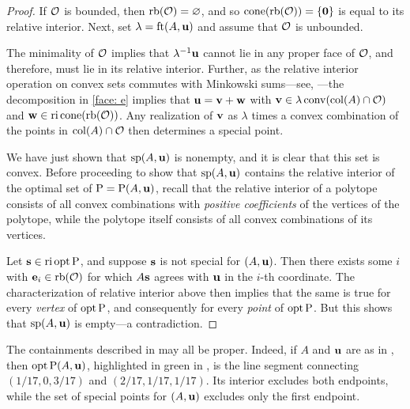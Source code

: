 \documentclass[11pt]{amsart}
\begin{document}
\begin{proof}
   If $\mathcal{O}$ is bounded, then $\operatorname{rb}(\mathcal{O}) = \varnothing$, and so $\operatorname{cone}( \operatorname{rb}(\mathcal{O})) = \{\mathbf{0} \}$ is equal to its relative interior.
   Next, set $\lambda = \operatorname{ft}(A, \mathbf{u})$ and assume that $\mathcal{O}$ is unbounded.

   The minimality of $\mathcal{O}$ implies that $\lambda^{-1}\mathbf{u}$ cannot lie in any proper face of $\mathcal{O}$, and therefore, must lie in its relative interior.  Further, as the relative interior operation on convex sets commutes with Minkowski sums---see, \eg \cite[Theorem 4.10(b)]{vantiel.convex_analysis}---the decomposition in \eqref{face: e}  implies that $\mathbf{u} = \mathbf{v} + \mathbf{w}$ with $\mathbf{v} \in \lambda \operatorname{conv}(\operatorname{col}(A) \cap \mathcal{O})$ and $\mathbf{w} \in \operatorname{ri} \operatorname{cone}(\operatorname{rb}(\mathcal{O}))$.  Any realization of $\mathbf{v}$ as $\lambda$ times a convex combination of the points in $\operatorname{col}(A) \cap \mathcal{O}$ then determines a special point.

 We have just shown that $\operatorname{sp}(A, \mathbf{u})$ is nonempty, and it is clear that this set is convex.
 Before proceeding to show that $\operatorname{sp}(A, \mathbf{u})$ contains the relative interior of the optimal set of $\mathrm{P} = \mathrm{P}(A,\mathbf{u})$,
  recall that the relative interior of a polytope consists of all convex combinations with \emph{positive coefficients} of the vertices of the polytope, while the polytope itself consists of all convex combinations of its vertices.

  Let $\mathbf{s} \in \operatorname{ri} \operatorname{opt} \mathrm{P}$, and suppose $\mathbf{s}$ is not special for $(A,\mathbf{u})$.
  Then there exists some $i$ with $\mathbf{e}_i \in \operatorname{rb}(\mathcal{O})$ for which $A\mathbf{s}$ agrees with $\mathbf{u}$ in the $i$-th coordinate.
  The characterization of relative interior above then implies that the same is true for every \emph{vertex} of $\operatorname{opt} \mathrm{P}$, and consequently for every \emph{point} of $\operatorname{opt} \mathrm{P}$.
  But this shows that $\operatorname{sp}(A,\mathbf{u})$ is empty---a contradiction.
\end{proof}


\begin{example}
   The containments described in  may all be proper.
   Indeed, if $A$ and $\mathbf{u}$ are as in , then $\operatorname{opt} \mathrm{P}(A,\mathbf{u})$, highlighted in green in , is the line segment connecting $(1/17, 0, 3/17)$ and $(2/17, 1/17, 1/17)$.
   Its interior excludes both endpoints, while the set of special points for $(A,\mathbf{u})$ excludes only the first endpoint.
\end{example}

\end{document}
